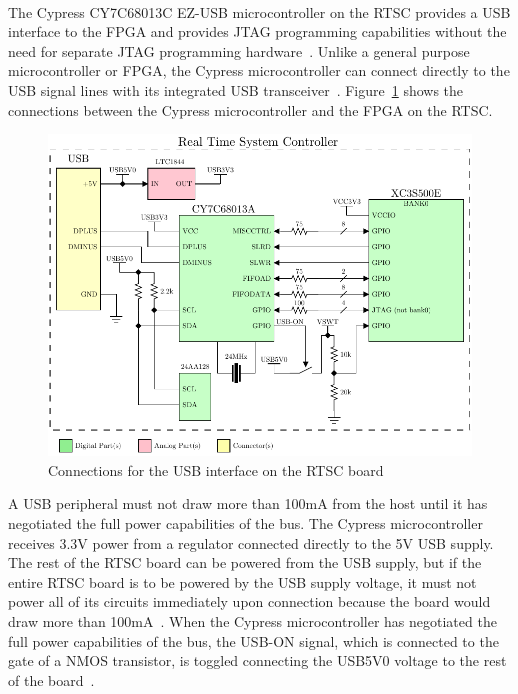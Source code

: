 The Cypress CY7C68013C EZ-USB\textsuperscript{\textregistered} microcontroller on the RTSC provides a USB interface to the FPGA and provides JTAG programming capabilities without the need for separate JTAG programming hardware~\cite{DigilentNexys2rm}.  Unlike a general purpose microcontroller or FPGA, the Cypress microcontroller can connect directly to the USB signal lines with its integrated USB transceiver~\cite{CypressDS}.  Figure~\ref{fig:Cypress} shows the connections between the Cypress microcontroller and the FPGA on the RTSC.




\begin{figure}[H]
	\centering 
		\includegraphics{./figures/Cypress} 
	\caption{Connections for the USB interface on the RTSC board~\cite{DigilentNexys2rm,DigilentNexys2sch}\label{fig:Cypress}}
\end{figure}

A USB peripheral must not draw more than 100mA from the host until it has negotiated the full power capabilities of the bus.  The Cypress microcontroller receives 3.3V power from a regulator connected directly to the 5V USB supply. The rest of the RTSC board can be powered from the USB supply, but if the entire RTSC board is to be powered by the USB supply voltage, it must not power all of its circuits immediately upon connection because the board would draw more than 100mA~\cite{DigilentNexys2rm}.  When the Cypress microcontroller has negotiated the full power capabilities of the bus, the USB-ON signal, which is connected to the gate of a NMOS transistor, is toggled connecting the USB5V0 voltage to the rest of the board~\cite{DigilentNexys2rm}.

